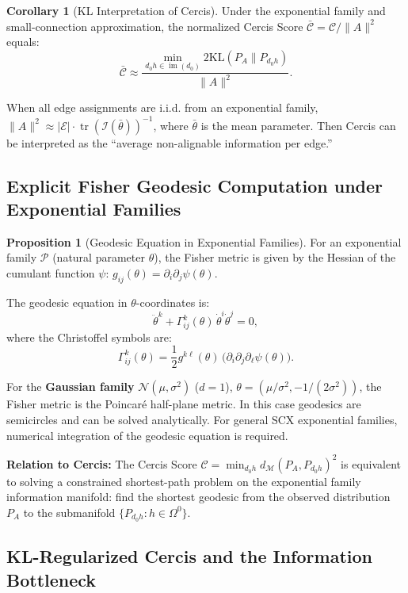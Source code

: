 \documentclass[12pt,a4paper]{article}
\theoremstyle{definition}
\newtheorem{proposition}{Proposition}[section]
\newtheorem{corollary}{Corollary}[section]
\theoremstyle{remark}
\theoremstyle{definition}
\newcommand{\edgs}{\mathcal{E}}
\newcommand{\cercis}{\mathcal{C}}
\newcommand{\cercisnorm}{\bar{\mathcal{C}}}
\newcommand{\Fisher}{\mathcal{I}}
\newcommand{\KL}{\mathrm{KL}}
\newcommand{\GeoDist}{d_{\mathcal{M}}}
\DeclareMathOperator{\im}{im}
\DeclareMathOperator{\tr}{tr}
\begin{document}
\begin{corollary}[KL Interpretation of Cercis]\label{cor:cercis_kl}
Under the exponential family and small-connection approximation, the normalized Cercis Score $\cercisnorm = \cercis / \|A\|^2$ equals:
\[
    \cercisnorm \approx \frac{\min_{d_0 h \in \im(d_0)} 2\KL(P_A \| P_{d_0 h})}{\|A\|^2}.
\]

When all edge assignments are i.i.d. from an exponential family, $\|A\|^2 \approx |\edgs| \cdot \tr(\Fisher(\bar{\theta}))^{-1}$,
where $\bar{\theta}$ is the mean parameter. Then Cercis can be interpreted as the ``average non-alignable information per edge.''
\end{corollary}

\subsection{Explicit Fisher Geodesic Computation under Exponential Families}

\begin{proposition}[Geodesic Equation in Exponential Families]\label{prop:exp_geodesic}
For an exponential family $\mathcal{P}$ (natural parameter $\theta$), the Fisher metric is given by the Hessian of the cumulant function $\psi$:
$g_{ij}(\theta) = \partial_i \partial_j \psi(\theta)$.

The geodesic equation in $\theta$-coordinates is:
\[
    \ddot{\theta}^k + \Gamma^k_{ij}(\theta) \, \dot{\theta}^i \dot{\theta}^j = 0,
\]
where the Christoffel symbols are:
\[
    \Gamma^k_{ij}(\theta) = \frac{1}{2} g^{k\ell}(\theta) \,
    \big(\partial_i \partial_j \partial_\ell \psi(\theta)\big).
\]

For the \textbf{Gaussian family} $\mathcal{N}(\mu, \sigma^2)$ ($d=1$), $\theta = (\mu/\sigma^2, -1/(2\sigma^2))$,
the Fisher metric is the Poincar\'{e} half-plane metric. In this case geodesics are semicircles and can be solved analytically.
For general SCX exponential families, numerical integration of the geodesic equation is required.

\textbf{Relation to Cercis:} The Cercis Score $\cercis = \min_{d_0 h} \GeoDist(P_A, P_{d_0 h})^2$ is equivalent to
solving a constrained shortest-path problem on the exponential family information manifold: find the shortest geodesic from the observed distribution $P_A$ to the submanifold
$\{P_{d_0 h} : h \in \Omega^0\}$.
\end{proposition}

\subsection{KL-Regularized Cercis and the Information Bottleneck}
\end{document}
